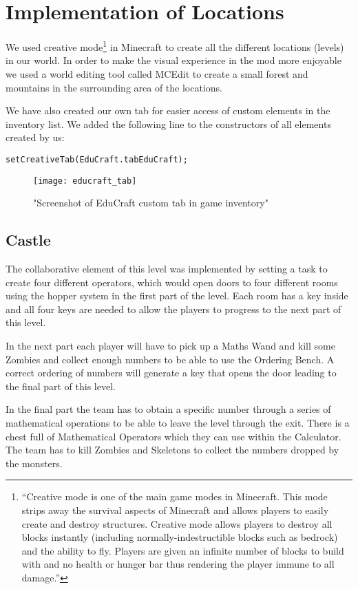 \section{Implementation of Locations}
We used creative mode\footnote{``Creative mode is one of the main game modes in Minecraft. This mode strips away the survival aspects of Minecraft and allows players to easily create and destroy structures. Creative mode allows players to destroy all blocks instantly (including normally-indestructible blocks such as bedrock) and the ability to fly. Players are given an infinite number of blocks to build with and no health or hunger bar thus rendering the player immune to all damage.''\cite{website:minecraft-creative}} in Minecraft to create all the different locations (levels) in our world. In order to make the visual experience in the mod more enjoyable we used a world editing tool called MCEdit to create a small forest and mountains in the surrounding area of the locations.

We have also created our own tab for easier access of custom elements in the inventory list. We added the following line to the constructors of all elements created by us:
\begin{lstlisting}
setCreativeTab(EduCraft.tabEduCraft);
\end{lstlisting}
\begin{figure}[h!]
\centering
\texttt{[image: educraft\_tab]}
\caption{"Screenshot of EduCraft custom tab in game inventory"}
\end{figure}

\subsection{Castle}
The collaborative element of this level was implemented by setting a task to create four different operators, which would open doors to four different rooms using the hopper system in the first part of the level. Each room has a key inside and all four keys are needed to allow the players to progress to the next part of this level.

In the next part each player will have to pick up a Maths Wand and kill some Zombies and collect enough numbers to be able to use the Ordering Bench. A correct ordering of numbers will generate a key that opens the door leading to the final part of this level.

In the final part the team has to obtain a specific number through a series of mathematical operations to be able to leave the level through the exit. There is a chest full of Mathematical Operators which they can use within the Calculator. The team has to kill Zombies and Skeletons to collect the numbers dropped by the monsters.

